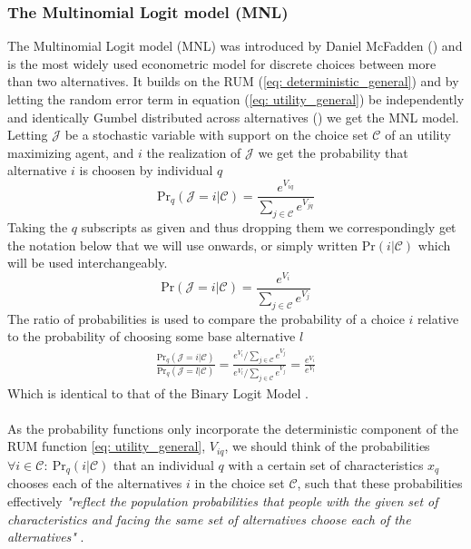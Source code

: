 \subsubsection{The Multinomial Logit model (MNL)} \label{sec: MNL}
The Multinomial Logit model (MNL) was introduced by Daniel McFadden (\citeyear{mcfadden_conditional_1973}) and is the most widely used econometric model for discrete choices between more than two alternatives. It builds on the RUM (\ref{eq: deterministic_general}) and by letting the random error term in equation (\ref{eq: utility_general}) be independently and identically Gumbel distributed across alternatives (\cite{koppelman_closed_2000}) we get the MNL model. Letting $\mathcal{J}$ be a stochastic variable with support on the choice set $\mathcal{C}$ of an utility maximizing agent, and $i$ the realization of $\mathcal{J}$ we get the probability that alternative $i$ is choosen by individual $q$
  \begin{equation*}
    \textrm{Pr}_q(\mathcal{J}=i|\mathcal{C})=
    \frac{e^{V_{iq}}}{\sum\limits_{j\in\mathcal{C}}e^{V_{jq}}}
  \end{equation*}
Taking the $q$ subscripts as given and thus dropping them we correspondingly get the notation below that we will use onwards, or simply written $\textrm{Pr}(i|\mathcal{C})$ which will be used interchangeably.
\begin{equation} \label{eq: MNL_general}
  \textrm{Pr}(\mathcal{J}=i|\mathcal{C})=
  \frac{e^{V_{i}}}{\sum\limits_{j\in\mathcal{C}}e^{V_{j}}}
\end{equation}
The ratio of probabilities is used to compare the probability of a choice $i$ relative to the probability of choosing some base alternative $l$
  \begin{equation} \label{eq: MNL_relative}
  \begin{split}
    \frac{\textrm{Pr}_q(\mathcal{J}=i|\mathcal{C})}{\textrm{Pr}_q(\mathcal{J}=l|\mathcal{C})}
    =\frac{e^{V_{i}}/\sum\limits_{j\in\mathcal{C}}e^{V_{j}}}{e^{V_{l}}/\sum\limits_{j\in\mathcal{C}}e^{V_{j}}} =\frac{e^{V_{i}}}{e^{V_{l}}}
  \end{split}
  \end{equation}
Which is identical to that of the Binary Logit Model  \citep{cameron_microeconometrics:_2005}.
\\ \\
As the probability functions only incorporate the deterministic component of the RUM function \eqref{eq: utility_general}, $V_{iq}$, we should think of the probabilities $\forall i\in \mathcal{C}:\ \textrm{Pr}_q(i|\mathcal{C})$ that an individual $q$ with a certain set of characteristics $x_q$ chooses each of the alternatives $i$ in the choice set $\mathcal{C}$, such that these probabilities effectively \textit{"reflect the population probabilities that people with the given set of characteristics and facing the same set of alternatives choose each of the alternatives"} \citep{koppelman_self_2006}.
